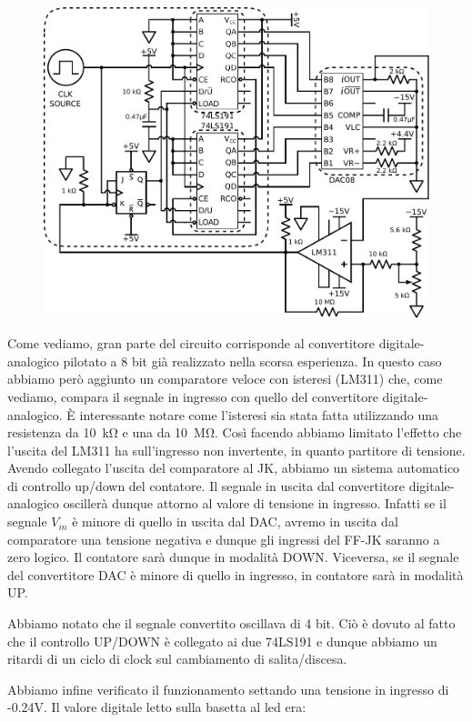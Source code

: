 \begin{figure}[htpc]
\centering
	\includegraphics[width=.73\textwidth]{../E13/latex/ADC.pdf}
	\caption{}
	\label{cir13:ADC}
\end{figure}

Come vediamo, gran parte del circuito corrisponde al convertitore digitale-analogico pilotato a 8 bit già realizzato nella scorsa esperienza. In questo caso abbiamo però aggiunto un comparatore veloce con isteresi (LM311) che, come vediamo, compara il segnale in ingresso con quello del convertitore digitale-analogico. È interessante notare come l'isteresi sia stata fatta utilizzando una resistenza da \SI{10}{\kilo\ohm} e una da \SI{10}{\mega\ohm}. Così facendo abbiamo limitato l'effetto che l'uscita del LM311 ha sull'ingresso non invertente, in quanto partitore di tensione. Avendo collegato l'uscita del comparatore al JK, abbiamo un sistema automatico di controllo up/down del contatore. Il segnale in uscita dal convertitore digitale-analogico oscillerà dunque attorno al valore di tensione in ingresso. Infatti se il segnale $V_{in}$ è minore di quello in uscita dal DAC, avremo in uscita dal comparatore una tensione negativa e dunque gli ingressi del FF-JK saranno a zero logico. Il contatore sarà  dunque in modalità DOWN. Viceversa, se il segnale del convertitore DAC è minore di quello in ingresso, in contatore sarà in modalità UP. 

Abbiamo notato che il segnale convertito oscillava di 4 bit. Ciò è dovuto al fatto che il controllo UP/DOWN è collegato ai due 74LS191 e dunque abbiamo un ritardi di un ciclo di clock sul cambiamento di salita/discesa.

Abbiamo infine verificato il funzionamento settando una tensione in ingresso di -0.24V. Il valore digitale letto sulla basetta al led era:

